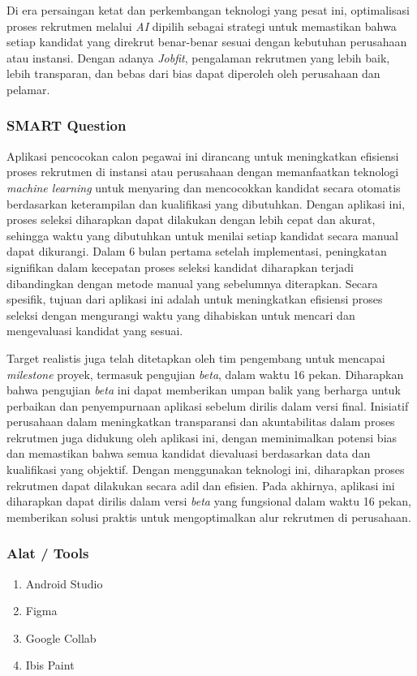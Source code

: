 \documentclass[journal,article,submit,pdftex,moreauthors]{Definitions/mdpi}
\begin{document}
Di era persaingan ketat dan perkembangan teknologi yang pesat ini, optimalisasi proses rekrutmen melalui \textit{AI} dipilih sebagai strategi untuk memastikan bahwa setiap kandidat yang direkrut benar-benar sesuai dengan kebutuhan perusahaan atau instansi. Dengan adanya \textit{Jobfit}, pengalaman rekrutmen yang lebih baik, lebih transparan, dan bebas dari bias dapat diperoleh oleh perusahaan dan pelamar.

\subsubsection{SMART Question}
Aplikasi pencocokan calon pegawai ini dirancang untuk meningkatkan efisiensi proses rekrutmen di instansi atau perusahaan dengan memanfaatkan teknologi \textit{machine learning} untuk menyaring dan mencocokkan kandidat secara otomatis berdasarkan keterampilan dan kualifikasi yang dibutuhkan. Dengan aplikasi ini, proses seleksi diharapkan dapat dilakukan dengan lebih cepat dan akurat, sehingga waktu yang dibutuhkan untuk menilai setiap kandidat secara manual dapat dikurangi. Dalam 6 bulan pertama setelah implementasi, peningkatan signifikan dalam kecepatan proses seleksi kandidat diharapkan terjadi dibandingkan dengan metode manual yang sebelumnya diterapkan. Secara spesifik, tujuan dari aplikasi ini adalah untuk meningkatkan efisiensi proses seleksi dengan mengurangi waktu yang dihabiskan untuk mencari dan mengevaluasi kandidat yang sesuai.

Target realistis juga telah ditetapkan oleh tim pengembang untuk mencapai \textit{milestone} proyek, termasuk pengujian \textit{beta}, dalam waktu 16 pekan. Diharapkan bahwa pengujian \textit{beta} ini dapat memberikan umpan balik yang berharga untuk perbaikan dan penyempurnaan aplikasi sebelum dirilis dalam versi final. Inisiatif perusahaan dalam meningkatkan transparansi dan akuntabilitas dalam proses rekrutmen juga didukung oleh aplikasi ini, dengan meminimalkan potensi bias dan memastikan bahwa semua kandidat dievaluasi berdasarkan data dan kualifikasi yang objektif. Dengan menggunakan teknologi ini, diharapkan proses rekrutmen dapat dilakukan secara adil dan efisien. Pada akhirnya, aplikasi ini diharapkan dapat dirilis dalam versi \textit{beta} yang fungsional dalam waktu 16 pekan, memberikan solusi praktis untuk mengoptimalkan alur rekrutmen di perusahaan.

\subsubsection{Alat / Tools}
\begin{enumerate}[left=2em]
    \item Android Studio
    \item Figma
    \item Google Collab
    \item Ibis Paint
\end{enumerate}
\end{document}
